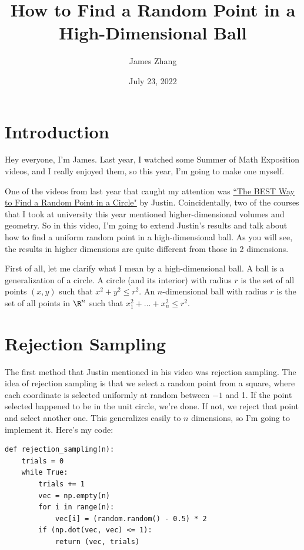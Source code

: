 \documentclass{article}
\title{How to Find a Random Point in a High-Dimensional Ball}
\author{James Zhang}
\date{July 23, 2022}
\begin{document}
\maketitle

\section{Introduction}

Hey everyone, I'm James. Last year, I watched some Summer of Math Exposition videos, and I really enjoyed them, so this year, I'm going to make one myself.

One of the videos from last year that caught my attention was \href{https://www.youtube.com/watch?v=4y_nmpv-9lI&list=PLnQX-jgAF5pTkwtUuVpqS5tuWmJ-6ZM-Z&index=6&t=3s}{``The BEST Way to Find a Random Point in a Circle"} by Justin. Coincidentally, two of the courses that I took at university this year mentioned higher-dimensional volumes and geometry. So in this video, I'm going to extend Justin's results and talk about how to find a uniform random point in a high-dimensional ball. As you will see, the results in higher dimensions are quite different from those in 2 dimensions.

First of all, let me clarify what I mean by a high-dimensional ball. A ball is a generalization of a circle. A circle (and its interior) with radius $r$ is the set of all points $(x, y)$ such that $x^2 + y^2 \leq r^2$. An $n$-dimensional ball with radius $r$ is the set of all points in $\R^n$ such that $x_1^2 + \ldots + x_n^2 \leq r^2$.

\section{Rejection Sampling}

The first method that Justin mentioned in his video was rejection sampling. The idea of rejection sampling is that we select a random point from a square, where each coordinate is selected uniformly at random between $-1$ and 1. If the point selected happened to be in the unit circle, we're done. If not, we reject that point and select another one. This generalizes easily to $n$ dimensions, so I'm going to implement it. Here's my code:

\begin{verbatim}
def rejection_sampling(n):
    trials = 0
    while True:
        trials += 1
        vec = np.empty(n)
        for i in range(n):
            vec[i] = (random.random() - 0.5) * 2
        if (np.dot(vec, vec) <= 1):
            return (vec, trials)
\end{verbatim}
\end{document}
